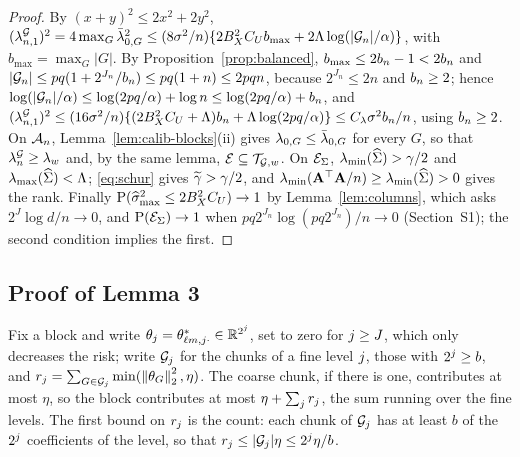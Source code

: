 \begin{proof}
By $(x+y)^{2} \le 2x^{2}+2y^{2}$, $(\lambda^{\mathcal{G}}_{n,1})^{2} = 4\max_{G}\bar{\lambda}_{0,G}^{2} \le
(8\sigma^{2}/n)\{2B_X^{2}C_U b_{\max} + 2\Lambda\log(|\mathcal{G}_{n}|/\alpha)\}$, with
$b_{\max} = \max_{G}|G|$. By Proposition~\ref{prop:balanced},
$b_{\max} \le 2b_{n} - 1 < 2b_{n}$ and $|\mathcal{G}_{n}| \le pq(1 + 2^{J_n}/b_{n}) \le
pq(1+n) \le 2pqn$, because $2^{J_n} \le 2n$ and $b_{n} \ge 2$; hence
$\log(|\mathcal{G}_{n}|/\alpha) \le \log(2pq/\alpha) + \log n \le \log(2pq/\alpha) +
b_{n}$, and $(\lambda^{\mathcal{G}}_{n,1})^{2} \le (16\sigma^{2}/n)\{(2B_X^{2}C_U + \Lambda)b_{n} +
\Lambda\log(2pq/\alpha)\} \le C_{\lambda}\sigma^{2}b_{n}/n$, using $b_{n} \ge 2$. On
$\mathcal{A}_{n}$, Lemma~\ref{lem:calib-blocks}(ii) gives $\lambda_{0,G} \le \bar{\lambda}_{0,G}$ for
every $G$, so that $\lambda^{\mathcal{G}}_{n} \ge \lambda_{w}$ and, by the same lemma,
$\mathcal{E} \subseteq \mathcal{T}_{\mathcal{G},w}$. On $\mathcal{E}_{\Sigma}$, $\lambda_{\min}(\widehat{\Sigma}) > \gamma/2$ and
$\lambda_{\max}(\widehat{\Sigma}) < \Lambda$; \eqref{eq:schur} gives $\widetilde{\gamma} > \gamma/2$, and
$\lambda_{\min}(\mathbf{A}^{\top}\mathbf{A}/n) \ge \lambda_{\min}(\widehat{\Sigma}) > 0$ gives the rank. Finally
$\mathrm{P}(\widehat{\sigma}_{\max}^{2} \le 2B_X^{2}C_U) \to 1$ by Lemma~\ref{lem:columns}, which asks
$2^{J}\log d/n \to 0$, and $\mathrm{P}(\mathcal{E}_{\Sigma}) \to 1$ when
$pq2^{J_n}\log(pq2^{J_n})/n \to 0$ (Section~S1); the second condition implies
the first.
\end{proof}




\subsection*{Proof of Lemma 3}

Fix a block and write $\theta_{j} = \theta^{*}_{\ell m,j\cdot} \in
\mathbb{R}^{2^{j}}$, set to zero for $j \ge J$, which only decreases the risk;
write $\mathcal{G}_{j}$ for the chunks of a fine level $j$, those with
$2^{j} \ge b$, and $r_{j} = \sum_{G\in\mathcal{G}_{j}}
\min(\left\lVert \theta_{G} \right\rVert_{2}^{2},\eta)$. The coarse chunk, if there is one,
contributes at most $\eta$, so the block contributes at most
$\eta + \sum_{j}r_{j}$, the sum running over the fine levels. The first
bound on $r_{j}$ is the count: each chunk of $\mathcal{G}_{j}$ has at least $b$
of the $2^{j}$ coefficients of the level, so that
$r_{j} \le |\mathcal{G}_{j}|\eta \le 2^{j}\eta/b$.

